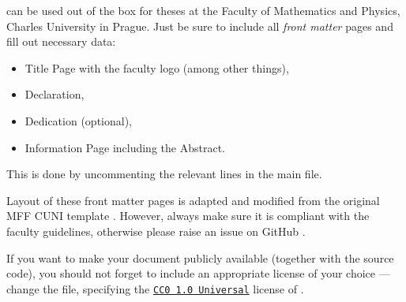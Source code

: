 \begin{remark}
    \TeXtured{} can be used out of the box for theses at the Faculty of Mathematics and Physics, Charles University in Prague.
    Just be sure to include all \emph{front matter} pages and fill out necessary data:
    \begin{itemize}
        \item \textsf{Title Page} with the faculty logo (among other things),
        \item \textsf{Declaration},
        \item \textsf{Dedication} (optional),
        \item \textsf{Information Page} including the \textsf{Abstract}.
    \end{itemize}
    This is done by uncommenting the relevant lines in the main  file.

    Layout of these front matter pages is adapted and modified from the original MFF CUNI template \autocite{MaresTemplate}.
    However, always make sure it is compliant with the faculty guidelines, otherwise please raise an issue on \textsf{GitHub} \autocite{TeXtured}.
\end{remark}

\begin{remark}[License]
    If you want to make your document publicly available (together with the source code), you should not forget to include an appropriate license of your choice --- change the  file, specifying the \href{https://creativecommons.org/publicdomain/zero/1.0/}{\texttt{CC0 1.0 Universal}} license of \TeXtured{}.
\end{remark}
